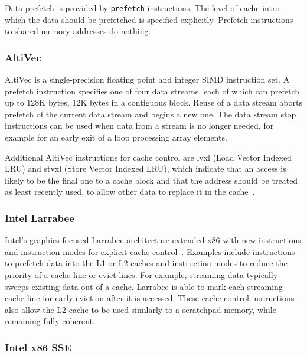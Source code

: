 Data prefetch is provided by \verb=prefetch= instructions. The level of cache intro which the data should be prefetched is specified explicitly. Prefetch instructions to shared memory addresses do nothing.

\subsubsection{AltiVec}
AltiVec is a single-precision floating point and integer SIMD instruction set.
A prefetch instruction specifies one of four data streams, each of which can prefetch up to 128K bytes, 12K bytes in a contiguous block. Reuse of a data stream aborts prefetch of the current data stream and begins a new one. The data stream stop instructions can be used when data from a stream is no longer needed, for example for an early exit of a loop processing array elements.

Additional AltiVec instructions for cache control are lvxl (Load Vector Indexed LRU) and stvxl (Store Vector Indexed LRU), which indicate that an access is likely to be the final one to a cache block and that the address should be treated as least recently used, to allow other data to replace it in the cache~\cite{gccprefetch}.

\subsubsection{Intel Larrabee}
Intel's graphics-focused Larrabee architecture extended x86 with new instructions and instruction modes for explicit cache control~\cite{Seiler:2008:LMX:1360612.1360617}.
Examples include instructions to prefetch data into the L1 or L2 caches and instruction modes to reduce the priority of a cache line or evict lines. For example, streaming data typically sweeps existing data out of a cache. Larrabee is able to mark each streaming cache line for early eviction after it is accessed. These cache control instructions also allow the L2 cache to be used similarly to a scratchpad memory, while remaining fully coherent.

\subsubsection{Intel x86 SSE}

